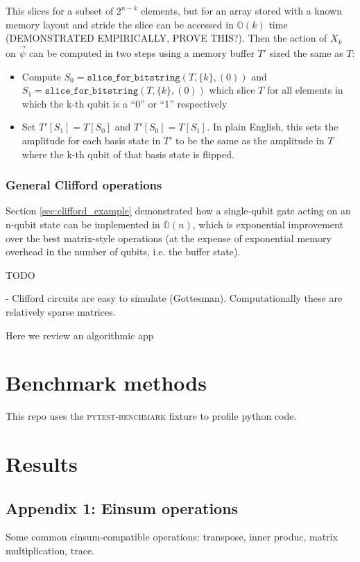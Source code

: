 \documentclass{article}
\begin{document}
This slices for a subset of $2^{n-k}$ elements, but for an array stored with a known memory layout and stride the slice can be accessed in $\mathbb{O}(k)$ time (DEMONSTRATED EMPIRICALLY, PROVE THIS?). Then the action of $X_k$ on $\vec{\psi}$ can be computed in two steps using a memory buffer $T'$ sized the same as $T$:
\begin{itemize}
	\item Compute $S_0 = \texttt{slice\_for\_bitstring}(T, \{k\}, (0))$ and \\$S_1= \texttt{slice\_for\_bitstring}(T, \{k\}, (0))$ which slice $T$ for all elements in which the k-th qubit is a ``0'' or ``1'' respectively
	\item Set $T'[S_1] = T[S_0]$ and $T'[S_0] = T[S_1]$. In plain English, this sets the amplitude for each basis state in $T'$ to be the same as the amplitude in $T$ where the k-th qubit of that basis state is flipped. 
\end{itemize}

\subsubsection{General Clifford operations}
Section \ref{sec:clifford_example} demonstrated how a single-qubit gate acting on an n-qubit state can be implemented in $\mathbb{O}(n)$, which is exponential improvement over the best matrix-style operations (at the expense of exponential memory overhead in the number of qubits, i.e. the buffer state).


TODO

- Clifford circuits are easy to simulate (Gottesman). Computationally these are relatively sparse matrices.

Here we review an algorithmic app

\section{Benchmark methods}
This repo uses the \textsc{pytest-benchmark} fixture to profile python code.

\section{Results}


\begin{appendices}
\section{Appendix 1: Einsum operations}
\label{sec:a1}

Some common einsum-compatible operations: transpose, inner produc, matrix multiplication, trace.
\end{appendices}
\end{document}
